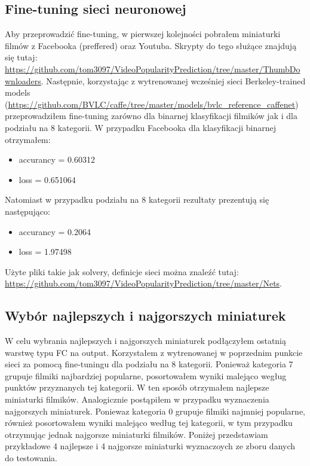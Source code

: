 \documentclass{article}
\begin{document}
\subsection{Fine-tuning sieci neuronowej}
Aby przeprowadzić fine-tuning, w pierwszej kolejności pobrałem miniaturki filmów z Facebooka (preffered) oraz Youtuba. Skrypty do tego służące znajdują się tutaj: \url{https://github.com/tom3097/VideoPopularityPrediction/tree/master/ThumbDownloaders}. Następnie, korzystając z wytrenowanej wcześniej sieci Berkeley-trained models (\url{https://github.com/BVLC/caffe/tree/master/models/bvlc_reference_caffenet}) przeprowadziłem fine-tuning zarówno dla binarnej klasyfikacji filmików jak i dla podziału na 8 kategorii. W przypadku Facebooka dla klasyfikacji binarnej otrzymałem:
\begin{itemize}
    \item accurancy = 0.60312
    \item loss = 0.651064
\end{itemize}
Natomiast w przypadku podziału na 8 kategorii rezultaty prezentują się następująco:
\begin{itemize}
    \item accurancy = 0.2064
    \item loss = 1.97498
\end{itemize}
Użyte pliki takie jak solvery, definicje sieci można znaleźć tutaj: \url{https://github.com/tom3097/VideoPopularityPrediction/tree/master/Nets}.

\subsection{Wybór najlepszych i najgorszych miniaturek}
W celu wybrania najlepszych i najgorszych miniaturek podłączyłem ostatnią warstwę typu FC na output. Korzystałem z wytrenowanej w poprzednim punkcie sieci za pomocą fine-tuningu dla podziału na 8 kategorii. Ponieważ kategoria 7 grupuje filmiki najbardziej popularne, posortowałem wyniki malejąco wegług punktów przyznanych tej kategorii. W ten sposób otrzymałem najlepsze miniaturki filmików. Analogicznie postąpiłem w przypadku wyznaczenia najgorszych miniaturek. Poniewaz kategoria 0 grupuje filmiki najmniej popularne, również posortowałem wyniki malejąco według tej kategorii, w tym przypadku otrzymując jednak najgorsze miniaturki filmików. Poniżej przedstawiam przykładowe 4 najlepsze i 4 najgorsze miniaturki wyznaczoych ze zboru danych do testowania.
\end{document}
